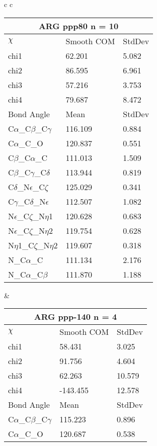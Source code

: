 \begin{longtable}{ c c }

  \begin{tabular}{ l l l }
  \toprule
  \multicolumn{3}{c}{ARG \textbf{ppp80} n = 10} \\ \toprule
  $\chi$       & Smooth COM & StdDev \\ \midrule
  chi1 & 62.201 & 5.082 \\ 
  chi2 & 86.595 & 6.961 \\ 
  chi3 & 57.216 & 3.753 \\ 
  chi4 & 79.687 & 8.472 \\ \midrule
  Bond Angle   & Mean     & StdDev \\ \midrule
  C$\alpha$\_C$\beta$\_C$\gamma$ & 116.109 & 0.884\\
  C$\alpha$\_C\_O & 120.837 & 0.551\\
  C$\beta$\_C$\alpha$\_C & 111.013 & 1.509\\
  C$\beta$\_C$\gamma$\_C$\delta$ & 113.944 & 0.819\\
  C$\delta$\_N$\epsilon$\_C$\zeta$ & 125.029 & 0.341\\
  C$\gamma$\_C$\delta$\_N$\epsilon$ & 112.507 & 1.082\\
  N$\epsilon$\_C$\zeta$\_N$\eta$1 & 120.628 & 0.683\\
  N$\epsilon$\_C$\zeta$\_N$\eta$2 & 119.754 & 0.628\\
  N$\eta$1\_C$\zeta$\_N$\eta$2 & 119.607 & 0.318\\
  N\_C$\alpha$\_C & 111.134 & 2.176\\
  N\_C$\alpha$\_C$\beta$ & 111.870 & 1.188\\
  \bottomrule
  \end{tabular}
  &
  \begin{tabular}{ l l l }
  \toprule
  \multicolumn{3}{c}{ARG \textbf{ppp-140} n = 4} \\ \toprule
  $\chi$       & Smooth COM & StdDev \\ \midrule
  chi1 & 58.431 & 3.025 \\ 
  chi2 & 91.756 & 4.604 \\ 
  chi3 & 62.263 & 10.579 \\ 
  chi4 & -143.455 & 12.578 \\ \midrule
  Bond Angle   & Mean     & StdDev \\ \midrule
  C$\alpha$\_C$\beta$\_C$\gamma$ & 115.223 & 0.896\\
  C$\alpha$\_C\_O & 120.687 & 0.538\\

\end{tabular}
\end{longtable}
